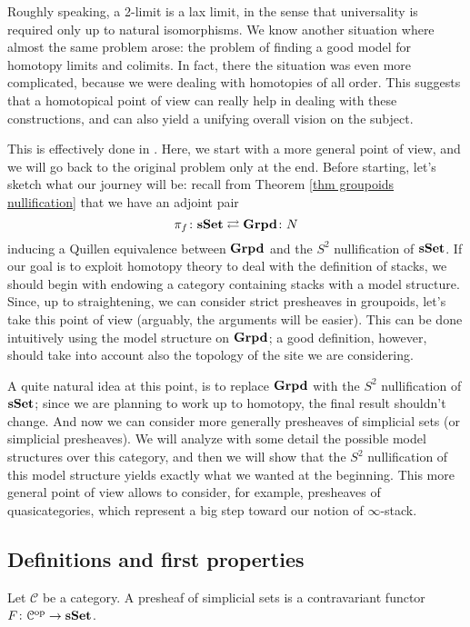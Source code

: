 \begin{refsection}
Roughly speaking, a 2-limit is a lax limit, in the sense that universality is required only up to natural isomorphisms. We know another situation where almost the same problem arose: the problem of finding a good model for homotopy limits and colimits. In fact, there the situation was even more complicated, because we were dealing with homotopies of all order. This suggests that a homotopical point of view can really help in dealing with these constructions, and can also yield a unifying overall vision on the subject.

This is effectively done in \cite{hollander}. Here, we start with a more general point of view, and we will go back to the original problem only at the end. Before starting, let's sketch what our journey will be: recall from Theorem \ref{thm groupoids nullification} that we have an adjoint pair
\[
\pi_f \colon \mathbf{sSet} \rightleftarrows \mathbf{Grpd} \colon N
\]
inducing a Quillen equivalence between $\mathbf{Grpd}$ and the $S^2$ nullification of $\mathbf{sSet}$. If our goal is to exploit homotopy theory to deal with the definition of stacks, we should begin with endowing a category containing stacks with a model structure. Since, up to straightening, we can consider strict presheaves in groupoids, let's take this point of view (arguably, the arguments will be easier). This can be done intuitively using the model structure on $\mathbf{Grpd}$; a good definition, however, should take into account also the topology of the site we are considering.

A quite natural idea at this point, is to replace $\mathbf{Grpd}$ with the $S^2$ nullification of $\mathbf{sSet}$; since we are planning to work up to homotopy, the final result shouldn't change. And now we can consider more generally presheaves of simplicial sets (or simplicial presheaves). We will analyze with some detail the possible model structures over this category, and then we will show that the $S^2$ nullification of this model structure yields exactly what we wanted at the beginning. This more general point of view allows to consider, for example, presheaves of quasicategories, which represent a big step toward our notion of $\infty$-stack.

\subsection{Definitions and first properties}

\begin{defin}
Let $\mathcal C$ be a category. A presheaf of simplicial sets is a contravariant functor $F \colon \mathcal C^{\mathrm{op}} \to \mathbf{sSet}$.
\end{defin}


\end{refsection}

